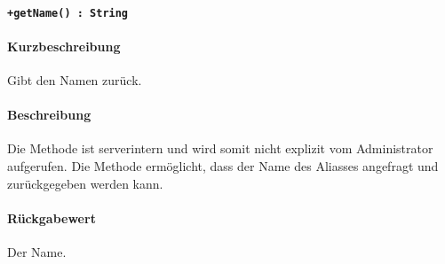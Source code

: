 \paragraph*{\texttt{+getName() : String}}%
\paragraph*{Kurzbeschreibung}
Gibt den Namen zurück.
\paragraph*{Beschreibung}
Die Methode ist serverintern und wird somit nicht explizit vom Administrator aufgerufen.
Die Methode ermöglicht, dass der Name des Aliasses angefragt und zurückgegeben werden kann.
\paragraph*{Rückgabewert}
Der Name.
